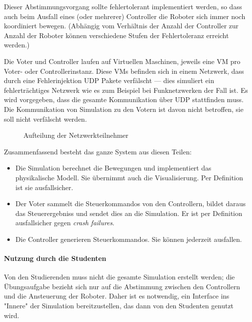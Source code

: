 Dieser Abstimmungsvorgang sollte fehlertolerant implementiert werden, so dass auch beim Ausfall eines (oder mehrerer) Controller die Roboter sich immer noch koordiniert bewegen.
(Abh{\"{a}}ngig vom Verh{\"{a}}ltnis der Anzahl der Controller zur Anzahl der Roboter k{\"{o}}nnen verschiedene Stufen der Fehlertoleranz erreicht werden.\cite[s.149]{Werner00})

Die Voter und Controller laufen auf Virtuellen Maschinen, jeweils eine VM pro Voter- oder Controllerinstanz.
Diese VMs befinden sich in einem Netzwerk, dass durch eine Fehlerinjektion UDP Pakete verf{\"{a}}lscht --- dies simuliert ein fehlertr{\"{a}}chtiges Netzwerk wie es zum Beispiel bei Funknetzwerken der Fall ist.
Es wird vorgegeben, dass die gesamte Kommunikation {\"{u}}ber UDP stattfinden muss. Die Kommunikation von Simulation zu den Votern ist davon nicht betroffen, sie soll nicht verf{\"{a}}lscht werden.

\begin{figure}
	\centering
	\caption{Aufteilung der Netzwerkteilnehmer}
	\label{fig:network}
\end{figure}

Zusammenfassend besteht das ganze System aus diesen Teilen:
\begin{itemize}
	\item Die Simulation berechnet die Bewegungen und implementiert das physikalische Modell. Sie {\"{u}}bernimmt auch die Visualisierung. Per Definition ist sie ausfallsicher.
	\item Der Voter sammelt die Steuerkommandos von den Controllern, bildet daraus das Steuerergebniss und sendet dies an die Simulation. Er ist per Definition ausfallsicher gegen \textit{crash failures}.
	\item Die Controller generieren Steuerkommandos. Sie k{\"{o}}nnen jederzeit ausfallen.
\end{itemize}

\paragraph{Nutzung durch die Studenten} Von den Studierenden muss nicht die gesamte Simulation erstellt werden; die {\"{U}}bungsaufgabe bezieht sich nur auf die Abstimmung zwischen den Controllern und die Ansteuerung der Roboter.
Daher ist es notwendig, ein Interface ins "Innere" der Simulation bereitzustellen, das dann von den Studenten genutzt wird.
